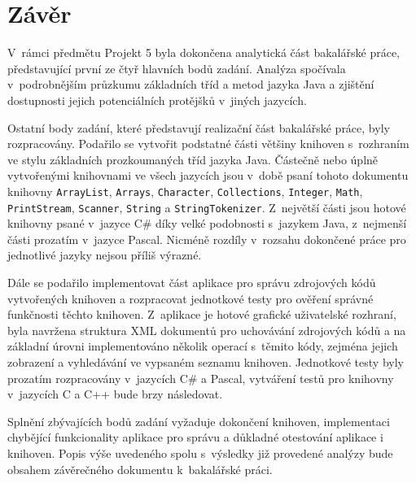 \documentclass{bakalarka}
\begin{document}
\chapter{Závěr}
V~rámci předmětu Projekt 5 byla dokončena analytická část bakalářské práce, představující první ze čtyř hlavních bodů zadání. Analýza spočívala v~podrobnějším průzkumu základních tříd a metod jazyka Java a zjištění dostupnosti jejich potenciálních protějšků v~jiných jazycích. \par
Ostatní body zadání, které představují realizační část bakalářské práce, byly rozpracovány. Podařilo se vytvořit podstatné části většiny knihoven s~rozhraním ve stylu základních prozkoumaných tříd jazyka Java. Částečně nebo úplně vytvořenými knihovnami ve všech jazycích jsou v~době psaní tohoto dokumentu knihovny \texttt{ArrayList}, \texttt{Arrays}, \texttt{Character}, \texttt{Collections}, \texttt{Integer}, \texttt{Math}, \texttt{PrintStream}, \texttt{Scanner}, \texttt{String} a \texttt{StringTokenizer}. Z~největší části jsou hotové knihovny psané v~jazyce C\# díky velké podobnosti s~jazykem Java, z~nejmenší části prozatím v~jazyce Pascal. Nicméně rozdíly v~rozsahu dokončené práce pro jednotlivé jazyky nejsou příliš výrazné. \par
Dále se podařilo implementovat část aplikace pro správu zdrojových kódů vytvořených knihoven a rozpracovat jednotkové testy pro ověření správné funkčnosti těchto knihoven. Z~aplikace je hotové grafické uživatelské rozhraní, byla navržena struktura XML dokumentů pro uchovávání zdrojových kódů a na základní úrovni implementováno několik operací s~těmito kódy, zejména jejich zobrazení a vyhledávání ve vypsaném seznamu knihoven. Jednotkové testy byly prozatím rozpracovány v~jazycích C\# a Pascal, vytváření testů pro knihovny v~jazycích C a C++ bude brzy následovat. \par
Splnění zbývajících bodů zadání vyžaduje dokončení knihoven, implementaci chybějící funkcionality aplikace pro správu a důkladné otestování aplikace i knihoven. Popis výše uvedeného spolu s~výsledky již provedené analýzy bude obsahem závěrečného dokumentu k~bakalářské práci.

\appendix


\end{document}
